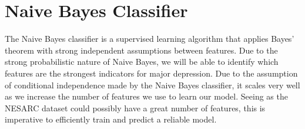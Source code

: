 \documentclass{article}
\begin{document}
\section{Naive Bayes Classifier}
\label{headings}

The Naive Bayes classifier is a supervised learning algorithm that applies Bayes' theorem with strong independent assumptions between features. Due to the strong probabilistic nature of Naive Bayes, we will be able to identify which features are the strongest indicators for major depression. Due to the assumption of conditional independence made by the Naive Bayes classifier, it scales very well as we increase the number of features we use to learn our model. Seeing as the NESARC dataset could possibly have a great number of features, this is imperative to efficiently train and predict a reliable model.
\end{document}
